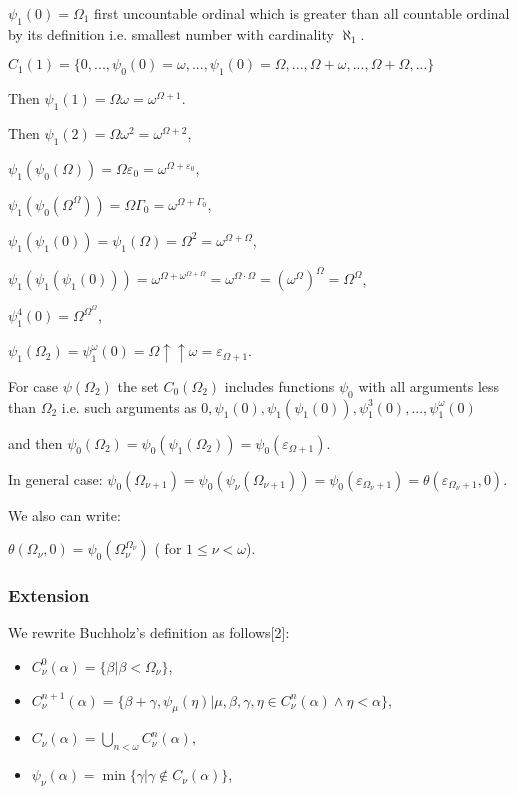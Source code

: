 \documentclass[10pt]{article}
\begin{document}
\(\psi_1(0)=\Omega_1\) first uncountable ordinal which is greater than all countable ordinal by its definition i.e. smallest number with cardinality \(\aleph_1\).

\(C_1(1)=\{0,...,\psi_0(0)=\omega,...,\psi_1(0)=\Omega,...,\Omega+\omega,...,\Omega+\Omega,...\}\)

Then \(\psi_1(1)=\Omega\omega=\omega^{\Omega+1}\).

Then \(\psi_1(2)=\Omega\omega^2=\omega^{\Omega+2}\),

\(\psi_1(\psi_0(\Omega))=\Omega\varepsilon_0=\omega^{\Omega+\varepsilon_0}\),

\(\psi_1(\psi_0(\Omega^\Omega))=\Omega\Gamma_0=\omega^{\Omega+\Gamma_0}\),

\(\psi_1(\psi_1(0))=\psi_1(\Omega)=\Omega^2=\omega^{\Omega+\Omega}\),

\(\psi_1(\psi_1(\psi_1(0)))=\omega^{\Omega+\omega^{\Omega+\Omega}}=\omega^{\Omega\cdot\Omega}=(\omega^{\Omega})^\Omega=\Omega^\Omega\),

\(\psi_1^4(0)=\Omega^{\Omega^\Omega}\),

\(\psi_1(\Omega_2)=\psi_1^\omega(0)=\Omega\uparrow\uparrow\omega=\varepsilon_{\Omega+1}\).

For case \(\psi(\Omega_2)\) the set \(C_0(\Omega_2)\) includes functions \(\psi_0\) with all arguments less than \(\Omega_2\) i.e. such arguments as \(0, \psi_1(0), \psi_1(\psi_1(0)), \psi_1^3(0),..., \psi_1^\omega(0)\)

and then \(\psi_0(\Omega_2)=\psi_0(\psi_1(\Omega_2))=\psi_0(\varepsilon_{\Omega+1})\).

In general case: \(\psi_0(\Omega_{\nu+1})=\psi_0(\psi_\nu(\Omega_{\nu+1}))=\psi_0(\varepsilon_{\Omega_\nu+1})=\theta(\varepsilon_{\Omega_\nu+1},0)\).

We also can write:

\(\theta(\Omega_\nu,0)=\psi_0(\Omega_\nu^{\Omega_\nu})\) ( for \( 1\le\nu<\omega\)).

\subsubsection{Extension}

We rewrite Buchholz's definition as follows[2]:

\begin{itemize}
     \setlength{\itemsep}{1pt}
     \setlength{\parskip}{0pt}
     \setlength{\parsep}{0pt}
\item \(C_\nu^0(\alpha) = \{\beta|\beta<\Omega_\nu\}\),
\item \(C_\nu^{n+1}(\alpha) = \{\beta+\gamma,\psi_\mu(\eta)|\mu,\beta, \gamma,\eta\in C_{\nu}^n(\alpha)\wedge\eta<\alpha\}\),
\item \(C_\nu(\alpha) = \bigcup_{n < \omega} C_\nu^n (\alpha)\),
\item \(\psi_\nu(\alpha) = \min\{\gamma | \gamma \not\in C_\nu(\alpha)\}\),
\end{itemize}
\end{document}
